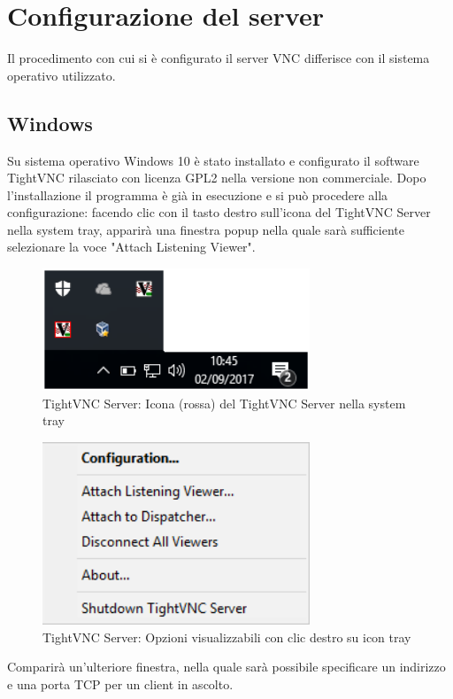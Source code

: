 \section{Configurazione del server}
Il procedimento con cui si è configurato il server VNC differisce con il sistema operativo utilizzato.
\subsection{Windows}
Su sistema operativo Windows 10 è stato installato e configurato il software TightVNC rilasciato con licenza GPL2 nella versione non commerciale.
Dopo l'installazione il programma è già in esecuzione e si può procedere alla configurazione:
facendo clic con il tasto destro sull'icona del TightVNC Server nella system tray, apparirà una finestra popup nella quale sarà sufficiente selezionare la voce "Attach Listening Viewer".

\begin{figure}[h]
\includegraphics[width=8cm]{../img/tightvncserver1}
\centering
\caption{TightVNC Server: Icona (rossa) del TightVNC Server nella system tray}
\end{figure}

\begin{figure}[h]
\includegraphics[width=8cm]{../img/tightvncserver2}
\centering
\caption{TightVNC Server: Opzioni visualizzabili con clic destro su icon tray}
\end{figure}

Comparirà un'ulteriore finestra, nella quale sarà possibile specificare un indirizzo e una porta TCP per un client in ascolto.

